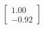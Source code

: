 \documentclass[preview]{standalone}
\begin{document}
\begin{align*}
\begin{bmatrix} 1.00 \\ -0.92 \end{bmatrix}
\end{align*}
\end{document}

